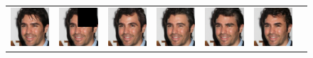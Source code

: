 \begin{figure}
\begin{center}
\begin{tabular}{ccccccc}
        \includegraphics[width=.145\textwidth]{Chapter2/samples/extended_results/inpainting/111/x.png} &   
        \includegraphics[width=.145\textwidth]{Chapter2/samples/extended_results/inpainting/111/y.png} &
        \includegraphics[width=.145\textwidth]{Chapter2/samples/extended_results/inpainting/111/CDE.png} & 
        \includegraphics[width=.145\textwidth]{Chapter2/samples/extended_results/inpainting/111/CDiffE.png} &
        \includegraphics[width=.145\textwidth]{Chapter2/samples/extended_results/inpainting/111/cmde.png} &
        \includegraphics[width=.145\textwidth]{Chapter2/samples/extended_results/inpainting/111/VS-CMDE.png}\\
        

\end{tabular}
\end{center}
\end{figure}
